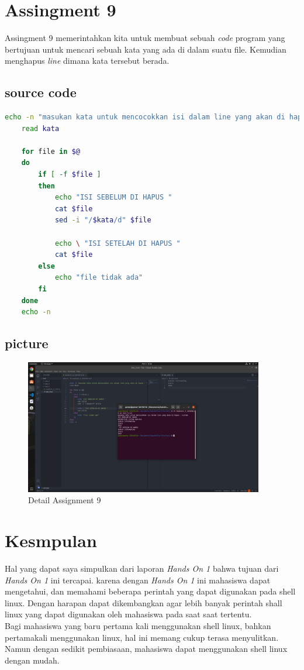 \documentclass[11pt,a4paper]{article}
\begin{document}
\newpage
\section{Assingment 9}
Assingment 9 memerintahkan kita untuk membuat sebuah \textit{code} program yang bertujuan untuk mencari sebuah kata yang ada di dalam suatu file.
Kemudian menghapus \textit{line} dimana kata tersebut berada.
\subsection*{source code}
\begin{lstlisting}[language=bash, caption={source code Assingment 9}]
	echo -n "masukan kata untuk mencocokkan isi dalam line yang akan di hapus : "
	read kata

	for file in $@
	do
		if [ -f $file ]
		then
			echo "ISI SEBELUM DI HAPUS "
			cat $file
			sed -i "/$kata/d" $file

			echo \ "ISI SETELAH DI HAPUS "
			cat $file
		else 
			echo "file tidak ada"
		fi
	done
	echo -n
\end{lstlisting}

\subsection*{picture}
\begin{figure}[h]
	\centering
	\includegraphics[width=0.93\textwidth]{figure/task_9.png}
	\caption{Detail Assignment 9}
\end{figure}


\newpage
\section{Kesmpulan}
Hal yang dapat saya simpulkan dari laporan \textit{Hands On 1} bahwa tujuan dari \textit{Hands On 1} ini tercapai. karena dengan \textit{Hands On 1} ini mahasiswa dapat mengetahui, dan memahami beberapa perintah yang dapat digunakan pada shell linux.
Dengan harapan dapat dikembangkan agar lebih banyak perintah shall linux yang dapat digunakan oleh mahasiswa pada saat saat tertentu.\\
Bagi mahasiswa yang baru pertama kali menggunakan shell linux, bahkan pertamakali menggunakan linux, hal ini memang cukup terasa menyulitkan. Namun dengan sedikit pembiasaan, mahasiswa dapat menggunakan shell linux dengan mudah.
\end{document}
